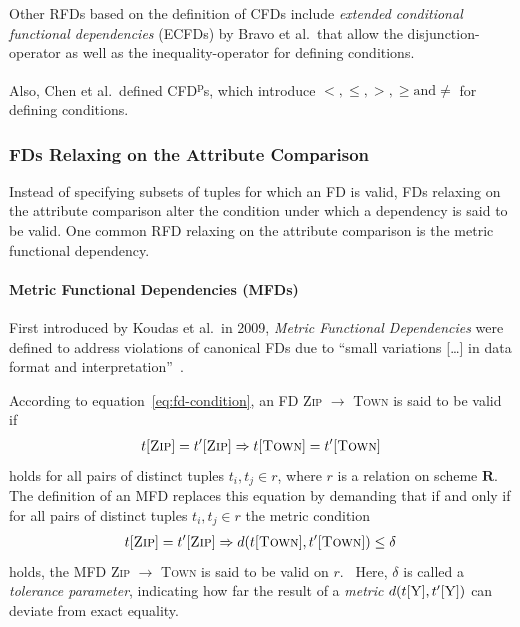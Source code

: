 Other RFDs based on the definition of CFDs include \emph{extended conditional functional dependencies} (ECFDs) by Bravo et al.\ that allow the disjunction-operator as well as the inequality-operator for defining conditions.~\cite{BRA08}

Also, Chen et al.\ defined CFD\textsuperscript{p}s, which introduce \( <, \leq, >, \geq \text{and} \neq \) for defining conditions.~\cite{CHE09}

\subsubsection{FDs Relaxing on the Attribute Comparison}
Instead of specifying subsets of tuples for which an FD is valid, FDs relaxing on the attribute comparison alter the condition under which a dependency is said to be valid.
One common RFD relaxing on the attribute comparison is the metric functional dependency.

\paragraph{Metric Functional Dependencies (MFDs)}
First introduced by Koudas et al.\ in 2009, \emph{Metric Functional Dependencies} were defined to address violations of canonical FDs due to ``small variations [\dots] in data format and interpretation''~\cite[p.~1]{KOU09}.

According to equation~\ref{eq:fd-condition}, an FD \textsc{Zip} \( \to\) \textsc{Town} is said to be valid if
\begin{align}
    t[\textsc{Zip}] = t'[\textsc{Zip}] \Rightarrow t[\textsc{Town}] = t'[\textsc{Town}]
\end{align}
holds for all pairs of distinct tuples \( t_i, t_j \in r \), where \( r \) is a relation on scheme \( \boldsymbol{R} \).
The definition of an MFD replaces this equation by demanding that if and only if for all pairs of distinct tuples \( t_i, t_j \in r \) the metric condition
\begin{align}\label{eq:mfd-condition}
    t[\textsc{Zip}] = t'[\textsc{Zip}] \Rightarrow d(t[\textsc{Town}], t'[\textsc{Town}]) \leq \delta
\end{align}
holds, the MFD \textsc{Zip} \( \to\) \textsc{Town} is said to be valid on \( r \).~\cite[p.~2]{KOU09}
Here, \( \delta \) is called a \emph{tolerance parameter}, indicating how far the result of a \emph{metric} \( d(t[\textsc{Y}], t'[\textsc{Y}]) \) can deviate from exact equality.

